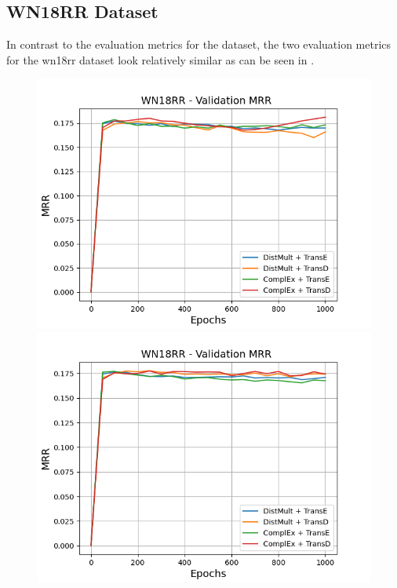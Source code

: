 \subsection{WN18RR Dataset}
\label{subsec:methods_wn18rr}

In contrast to the evaluation metrics for the \umls dataset, the two evaluation metrics for the wn18rr dataset look relatively similar as can be seen in .
\begin{figure}
    \centering
    \begin{minipage}{.5\textwidth}
      \centering
      \includegraphics[width=0.9\linewidth]{figures/results/gan_train/not_pretrained/uncertainty/max/entropy/wn18rr/uncertainty_wn18rr_mrrs.png}
    \end{minipage}%
    \begin{minipage}{.5\textwidth}
      \centering
      \includegraphics[width=0.9\linewidth]{figures/results/gan_train/not_pretrained/uncertainty/max_distribution/entropy/wn18rr/uncertainty_wn18rr_mrrs.png}

\end{minipage}
\end{figure}
